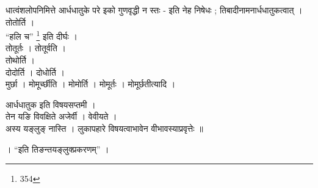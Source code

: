 धात्वंशलोपनिमित्ते आर्धधातुके परे इको गुणवृद्धी न स्तः - इति नेह निषेधः ; तिबादीनामनार्धधातुकत्वात् । \\
तोतोर्ति । \\
``हलि च'' \footnote{
  354
}
इति दीर्घः ।\\
तोतूर्तः । तोतूर्वति ।\\
तोथोर्ति । \\
दोदोर्ति । दोधोर्ति । \\
मुर्छा । मोमूर्च्छीति । मोमोर्ति । मोमूर्तः । मोमूर्छतीत्यादि । \par

आर्धधातुक इति विषयसप्तमी । \\
तेन यङि विवक्षिते अजेर्वी । वेवीयते ।\\
अस्य यङ्लुङ् नास्ति । लुकापहारे विषयत्वाभावेन वीभावस्याप्रवृत्तेः ॥ \par

। ``इति तिङन्तयङ्लुक्प्रकरणम्''‌ ।
